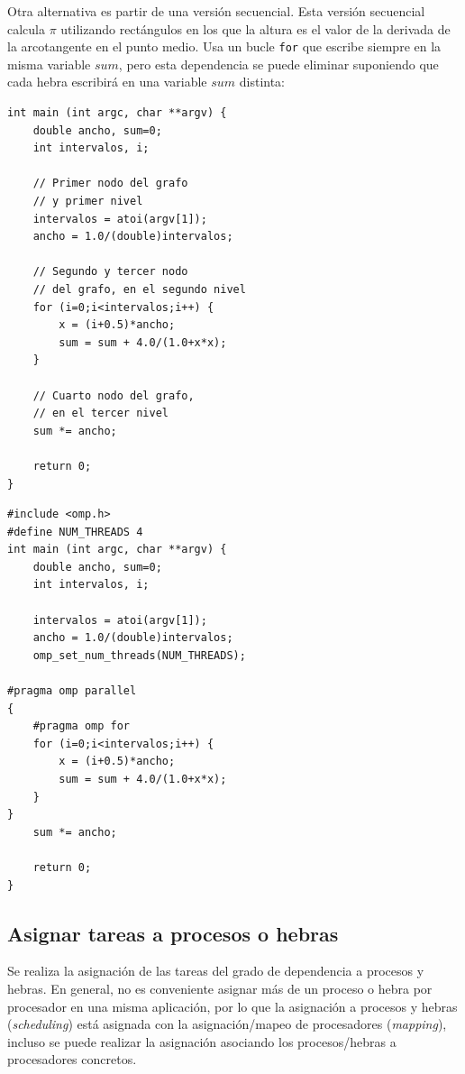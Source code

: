 \documentclass[10pt,a4paper,spanish]{report}
\begin{document}
Otra alternativa es partir de una versión secuencial. Esta versión secuencial calcula $\pi$ utilizando rectángulos en los que la altura es el valor de la derivada de la arcotangente en el punto medio. Usa un bucle \verb*|for| que escribe siempre en la misma variable $sum$, pero esta dependencia se puede eliminar suponiendo que cada hebra escribirá en una variable $sum$ distinta:\\[0.2cm]



\begin{minipage}{0.5\textwidth}
\begin{verbatim}
int main (int argc, char **argv) {
    double ancho, sum=0;
    int intervalos, i;

    // Primer nodo del grafo 
    // y primer nivel
    intervalos = atoi(argv[1]);
    ancho = 1.0/(double)intervalos;

    // Segundo y tercer nodo 
    // del grafo, en el segundo nivel
    for (i=0;i<intervalos;i++) {
        x = (i+0.5)*ancho;
        sum = sum + 4.0/(1.0+x*x);
    }

    // Cuarto nodo del grafo, 
    // en el tercer nivel
    sum *= ancho;

    return 0;
}
\end{verbatim}
\end{minipage}
\begin{minipage}{0.5\textwidth}
\begin{verbatim}
#include <omp.h>
#define NUM_THREADS 4
int main (int argc, char **argv) {
    double ancho, sum=0;
    int intervalos, i;

    intervalos = atoi(argv[1]);
    ancho = 1.0/(double)intervalos;
    omp_set_num_threads(NUM_THREADS);

#pragma omp parallel
{
    #pragma omp for
    for (i=0;i<intervalos;i++) {
        x = (i+0.5)*ancho;
        sum = sum + 4.0/(1.0+x*x);
    }
}
    sum *= ancho;

    return 0;
}
\end{verbatim}
\end{minipage}

\textcolor[rgb]{0.2,0.4,0.8}{\subsection{Asignar tareas a procesos o hebras}}
Se realiza la asignación de las tareas del grado de dependencia a procesos y hebras. En general, no es conveniente asignar más de un proceso o hebra por procesador en una misma aplicación, por lo que la asignación a procesos y hebras (\textit{\textcolor[rgb]{0.2,0.4,0.8}{scheduling}}) está asignada con la asignación/mapeo de procesadores (\textcolor[rgb]{0.2,0.4,0.8}{\textit{mapping}}), incluso se puede realizar la asignación asociando los procesos/hebras a procesadores concretos. 
\end{document}
